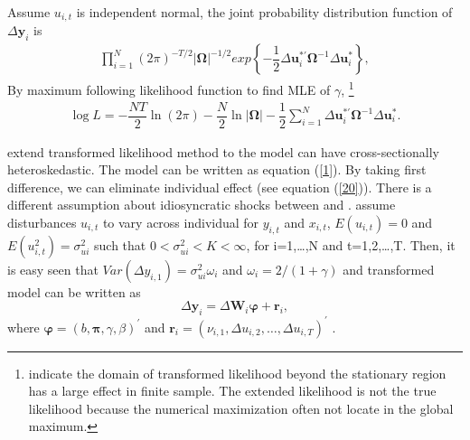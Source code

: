 \documentclass[12pt,a4paper,hyperref]{article}
\begin{document}
Assume $u_{i,t}$ is independent normal, the joint probability distribution function of $\Delta \boldsymbol{y}_{i}$ is
\begin{align}
\prod^{N}_{i=1} \left( 2 \pi \right)^{-T/2} \left\vert \boldsymbol{\Omega} \right\vert^{-1/2} exp\left\lbrace -\dfrac{1}{2} \Delta \boldsymbol{u}_{i}^{\ast '} \boldsymbol{\Omega}^{-1} \Delta \boldsymbol{u}^{\ast}_{i} \right\rbrace,
\end{align}
By maximum following likelihood function to find MLE of $\gamma$,
\footnote{\citet{Han:2013} indicate the domain of transformed likelihood beyond the stationary region has a large effect in finite sample. The extended likelihood is not the true likelihood because the numerical maximization often not locate in the global maximum.}
\begin{align}
\log L= - \dfrac{NT}{2} \ln (2 \pi) -\dfrac{N}{2} \ln \left\vert \boldsymbol{\Omega} \right\vert-\dfrac{1}{2} \sum^{N}_{i=1} \Delta \boldsymbol{u}_{i}^{\ast '} \boldsymbol{\Omega}^{-1} \Delta \boldsymbol{u}_{i}^{\ast}.
\end{align}

\citet{Hayakawa:2015} extend transformed likelihood method to the model can have cross-sectionally heteroskedastic. The model can be written as equation (\ref{1}). By taking first difference, we can eliminate individual effect (see equation (\ref{20})). There is a different assumption about idiosyncratic shocks between \citet{Hsiao:2002} and \citet{Hayakawa:2015}. \citet{Hayakawa:2015} assume disturbances $u_{i,t}$ to vary across individual for $y_{i,t}$ and $x_{i,t}$, $E(u_{i,t})=0$  and $E(u^{2}_{i,t})=\sigma^{2}_{ui}$ such that $0<\sigma^{2}_{ui}<K<\infty$, for i=1,\ldots,N and t=1,2,\ldots,T. Then, it is easy seen that $Var(\Delta y_{i,1})=\sigma^{2}_{ui}\omega_{i}$ and $\omega_{i}=2/(1+\gamma)$
 and transformed model can be written as
\begin{equation}
\Delta \boldsymbol{y}_{i}=\Delta \boldsymbol{W}_{i} \boldsymbol{\varphi}+ \boldsymbol{r}_{i},
\end{equation}
where $\boldsymbol{\varphi}=(b,\boldsymbol{\pi}, \gamma, \beta)^{'}$ and $\boldsymbol{r}_{i}=(\nu_{i,1}, \Delta u_{i,2},\ldots, \Delta u_{i,T})^{'}$ .
\end{document}
